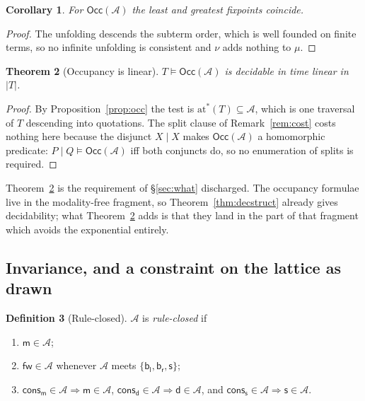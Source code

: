 \documentclass[11pt]{article}
\theoremstyle{plain}
\newtheorem{theorem}{Theorem}[section]
\newtheorem{corollary}[theorem]{Corollary}
\theoremstyle{definition}
\newtheorem{definition}[theorem]{Definition}
\theoremstyle{remark}
\newcommand{\mm}{\mathsf{m}}
\newcommand{\dd}{\mathsf{d}}
\newcommand{\fw}{\mathsf{fw}}
\newcommand{\bl}{\mathsf{b}_{\mathsf{l}}}
\newcommand{\br}{\mathsf{b}_{\mathsf{r}}}
\newcommand{\sy}{\mathsf{s}}
\newcommand{\cons}{\mathsf{cons}}
\newcommand{\consm}{\cons_{\mm}}
\newcommand{\consd}{\cons_{\dd}}
\newcommand{\conss}{\cons_{\sy}}
\newcommand{\sat}{\models}
\newcommand{\Occ}{\mathsf{Occ}}
\newcommand{\Atm}{\mathcal{A}}
\newcommand{\atoms}[1]{\mathrm{at}^{*}(#1)}
\begin{document}
\begin{corollary}
\label{cor:munu}
For $\Occ(\Atm)$ the least and greatest fixpoints coincide.
\end{corollary}

\begin{proof}
The unfolding descends the subterm order, which is well founded on finite
terms, so no infinite unfolding is consistent and $\nu$ adds nothing to $\mu$.
\end{proof}

\begin{theorem}[Occupancy is linear]
\label{thm:occlinear}
$T \sat \Occ(\Atm)$ is decidable in time linear in $|T|$.
\end{theorem}

\begin{proof}
By Proposition~\ref{prop:occ} the test is $\atoms{T} \subseteq \Atm$, which is
one traversal of $T$ descending into quotations. The split clause of
Remark~\ref{rem:cost} costs nothing here because the disjunct $X \mid X$ makes
$\Occ(\Atm)$ a homomorphic predicate: $P \mid Q \sat \Occ(\Atm)$ iff both
conjuncts do, so no enumeration of splits is required.
\end{proof}

Theorem~\ref{thm:occlinear} is the requirement of \S\ref{sec:what} discharged.
The occupancy formulae live in the modality-free fragment, so
Theorem~\ref{thm:decstruct} already gives decidability; what
Theorem~\ref{thm:occlinear} adds is that they land in the part of that fragment
which avoids the exponential entirely.

\subsection{Invariance, and a constraint on the lattice as drawn}

\begin{definition}[Rule-closed]
\label{def:ruleclosed}
$\Atm$ is \emph{rule-closed} if
\begin{enumerate}[label=(R\arabic*),leftmargin=2.6em,itemsep=2pt,topsep=3pt]
\item $\mm \in \Atm$;
\item $\fw \in \Atm$ whenever $\Atm$ meets $\{\bl,\br,\sy\}$;
\item $\consm \in \Atm \Rightarrow \mm \in \Atm$,
      $\consd \in \Atm \Rightarrow \dd \in \Atm$, and
      $\conss \in \Atm \Rightarrow \sy \in \Atm$.
\end{enumerate}
\end{definition}
\end{document}
